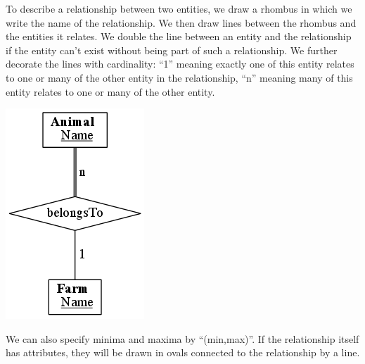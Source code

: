 \newpage

To describe a relationship between two entities, we draw a rhombus in
which we write the name of the relationship.  We then draw lines
between the rhombus and the entities it relates.  We double the line
between an entity and the relationship if the entity can't exist
without being part of such a relationship.  We further decorate the
lines with cardinality: ``1'' meaning exactly one of this entity
relates to one or many of the other entity in the relationship, ``n''
meaning many of this entity relates to one or many of the other entity.

\includegraphics{figs/relationship.png}

We can also specify minima and maxima by ``(min,max)''.  If the
relationship itself has attributes, they will be drawn in ovals
connected to the relationship by a line.
